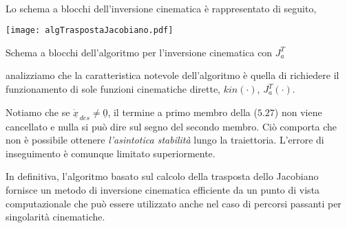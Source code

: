 \paragraph{}
Lo schema a blocchi dell'inversione cinematica è rappresentato di seguito,
\begin{center}
	\texttt{[image: algTraspostaJacobiano.pdf]}
	\caption{Schema a blocchi dell'algoritmo per l'inversione cinematica con $J_a^T$}
\end{center}
analizziamo che la caratteristica notevole dell'algoritmo è quella di richiedere il funzionamento di sole funzioni cinematiche dirette, $kin(\cdot)$, $J_a^T(\cdot)$.

Notiamo che se $\underline{\dot{x}}_{\,des} \neq \underline{0}$, il termine a primo membro della ($5.27$) non viene cancellato e nulla si può dire sul segno del secondo membro. Ciò comporta che non è possibile ottenere \emph{l'asintotica stabilità} lungo la traiettoria. L'errore di inseguimento è comunque limitato superiormente.

In definitiva, l'algoritmo basato sul calcolo della trasposta dello Jacobiano fornisce un metodo di inversione cinematica efficiente da un punto di vista computazionale che può essere utilizzato anche nel caso di percorsi passanti per singolarità cinematiche.
